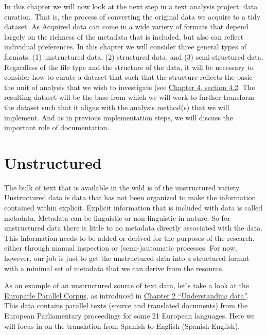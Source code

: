 \documentclass[
  letterpaper,
]{latex/krantz}
\begin{document}
In this chapter we will now look at the next step in a text analysis
project: data curation. That is, the process of converting the original
data we acquire to a tidy dataset. As Acquired data can come in a wide
variety of formats that depend largely on the richness of the metadata
that is included, but also can reflect individual preferences. In this
chapter we will consider three general types of formats: (1)
unstructured data, (2) structured data, and (3) semi-structured data.
Regardless of the file type and the structure of the data, it will be
necessary to consider how to curate a dataset that such that the
structure reflects the basic the unit of analysis that we wish to
investigate (see
\protect\hyperlink{sec-framing-research.htmlux5cux23research-question}{Chapter
4, section 4.2}. The resulting dataset will be the base from which we
will work to further transform the dataset such that it aligns with the
analysis method(s) that we will implement. And as in previous
implementation steps, we will discuss the important role of
documentation.

\hypertarget{unstructured}{%
\section{Unstructured}\label{unstructured}}

The bulk of text that is available in the wild is of the unstructured
variety. Unstructured data is data that has not been organized to make
the information contained within explicit. Explicit information that is
included with data is called metadata. Metadata can be linguistic or
non-linguistic in nature. So for unstructured data there is little to no
metadata directly associated with the data. This information needs to be
added or derived for the purposes of the research, either through manual
inspection or (semi-)automatic processes. For now, however, our job is
just to get the unstructured data into a structured format with a
minimal set of metadata that we can derive from the resource.

As an example of an unstructured source of text data, let's take a look
at the \href{https://www.statmt.org/europarl/}{Europarle Parallel
Corpus}, as introduced in
\protect\hyperlink{sec-understanding-data}{Chapter 2 ``Understanding
data''}. This data contains parallel texts (source and translated
documents) from the European Parliamentary proceedings for some 21
European languages. Here we will focus in on the translation from
Spanish to English (Spanish-English).
\end{document}
